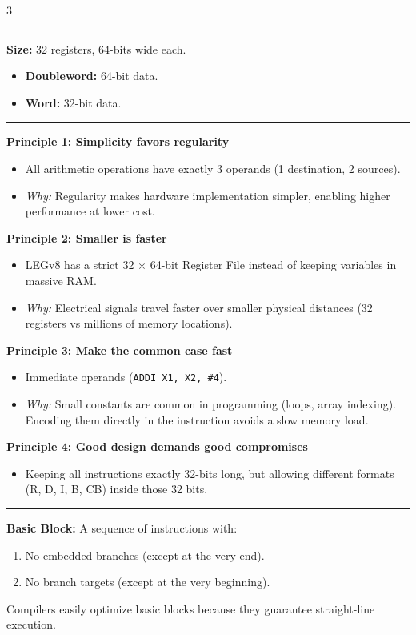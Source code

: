 \documentclass[6pt, letterpaper]{article}
\newcommand{\sectionhead}[1]{%
    \vspace{1mm}{\large\bfseries#1}\vspace{0.2mm}\hrule\vspace{0.8mm}%
}
\begin{document}
\begin{multicols}{3}
\sectionhead{Registers}
\textbf{Size:} 32 registers, 64-bits wide each.
\begin{itemize}
    \item \textbf{Doubleword:} 64-bit data.
    \item \textbf{Word:} 32-bit data.
\end{itemize}

\columnbreak

\sectionhead{ISA \& Design Principles}

\textbf{Principle 1: Simplicity favors regularity}
\begin{itemize}
    \item  All arithmetic operations have exactly 3 operands (1 destination, 2 sources).
    \item \textit{Why:} Regularity makes hardware implementation simpler, enabling higher performance at lower cost.
\end{itemize}

\textbf{Principle 2: Smaller is faster}
\begin{itemize}
    \item  LEGv8 has a strict 32 $\times$ 64-bit Register File instead of keeping variables in massive RAM.
    \item \textit{Why:} Electrical signals travel faster over smaller physical distances (32 registers vs millions of memory locations).
\end{itemize}

\textbf{Principle 3: Make the common case fast}
\begin{itemize}
    \item  Immediate operands (\texttt{ADDI X1, X2, \#4}).
    \item \textit{Why:} Small constants are common in programming (loops, array indexing). Encoding them directly in the instruction avoids a slow memory load.
\end{itemize}

\textbf{Principle 4: Good design demands good compromises}
\begin{itemize}
    \item  Keeping all instructions exactly 32-bits long, but allowing different formats (R, D, I, B, CB) inside those 32 bits.
\end{itemize}




\sectionhead{Basic Blocks \& Compilation}
\textbf{Basic Block:} A sequence of instructions with:
\begin{enumerate}
    \item No embedded branches (except at the very end).
    \item No branch targets (except at the very beginning).
\end{enumerate}
Compilers easily optimize basic blocks because they guarantee straight-line execution.


\end{multicols}
\end{document}
